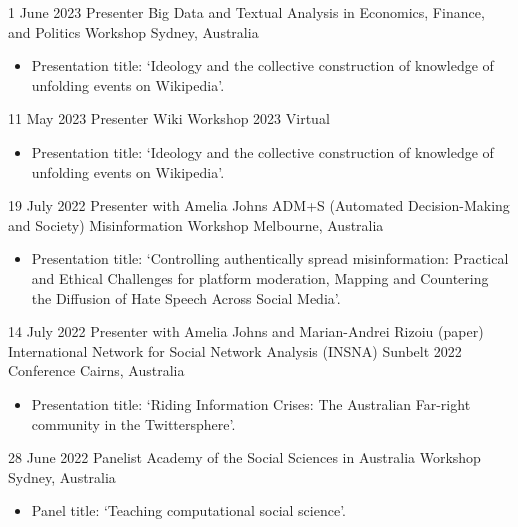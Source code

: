 \documentclass[11pt,a4paper,sans]{moderncv}
\begin{document}
\cventry 
{1 June 2023}
{Presenter}
{Big Data and Textual Analysis in Economics, Finance, and Politics Workshop}
{Sydney, Australia}
{}
      {
      \begin{itemize} %
        \item {Presentation title: `Ideology and the collective construction of knowledge of unfolding events on Wikipedia'.}
      \end{itemize}
    }

\cventry 
{11 May 2023}
{Presenter}
{Wiki Workshop 2023}
{Virtual}
{}
      {
      \begin{itemize} %
        \item {Presentation title: `Ideology and the collective construction of knowledge of unfolding events on Wikipedia'.}
      \end{itemize}
    }
 
\cventry %
{19 July 2022}
{Presenter with Amelia Johns}
{ADM+S (Automated Decision-Making and Society) Misinformation Workshop}
{Melbourne, Australia}
{}
      {
      \begin{itemize} %
        \item {Presentation title: `Controlling authentically spread misinformation: Practical and Ethical
Challenges for platform moderation, Mapping and Countering the Diffusion of Hate Speech Across Social Media'.}
      \end{itemize}
    }

\cventry %
{14 July 2022}
{Presenter with Amelia Johns and Marian-Andrei Rizoiu (paper)}
{International Network for Social Network Analysis (INSNA) Sunbelt 2022 Conference}
{Cairns, Australia}
{}
       {
      \begin{itemize} %
        \item {Presentation title: `Riding Information Crises: The
            Australian Far-right community in the Twittersphere'.}
      \end{itemize}
    }

\cventry %
{28 June 2022}
{Panelist}
{Academy of the Social Sciences in Australia Workshop}
{Sydney, Australia}
{}
       {
      \begin{itemize} %
        \item {Panel title: `Teaching computational social science'.}
      \end{itemize}
    }
\end{document}
